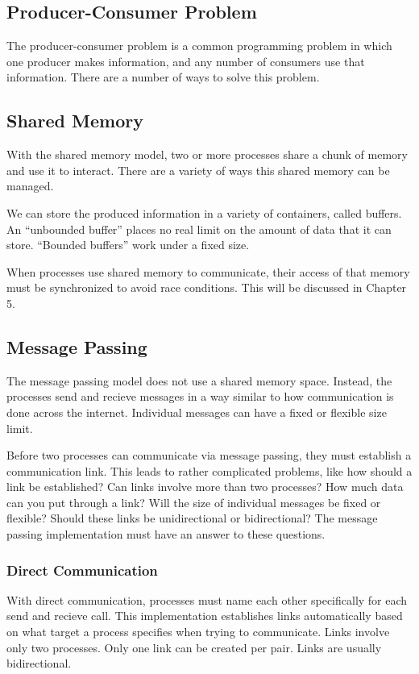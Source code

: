 \documentclass{article}
\begin{document}
\subsection{Producer-Consumer Problem}
The producer-consumer problem is a common programming problem in which one
producer makes information, and any number of consumers use that information.
There are a number of ways to solve this problem.

\subsection{Shared Memory}
With the shared memory model, two or more processes share a chunk of memory and
use it to interact. There are a variety of ways this shared memory can be
managed.

We can store the produced information in a variety of containers, called
buffers. An ``unbounded buffer'' places no real limit on the amount of data
that it can store. ``Bounded buffers'' work under a fixed size.

When processes use shared memory to communicate, their access of that memory
must be synchronized to avoid race conditions. This will be discussed in
Chapter 5.

\subsection{Message Passing}
The message passing model does not use a shared memory space. Instead, the
processes send and recieve messages in a way similar to how communication is
done across the internet. Individual messages can have a fixed or flexible size
limit.

Before two processes can communicate via message passing, they must establish a
communication link. This leads to rather complicated problems, like how should
a link be established? Can links involve more than two processes? How much data
can you put through a link? Will the size of individual messages be fixed or
flexible? Should these links be unidirectional or bidirectional? The message
passing implementation must have an answer to these questions.

\subsubsection{Direct Communication}
With direct communication, processes must name each other specifically for each
send and recieve call. This implementation establishes links automatically
based on what target a process specifies when trying to communicate. Links
involve only two processes. Only one link can be created per pair. Links are
usually bidirectional.
\end{document}
